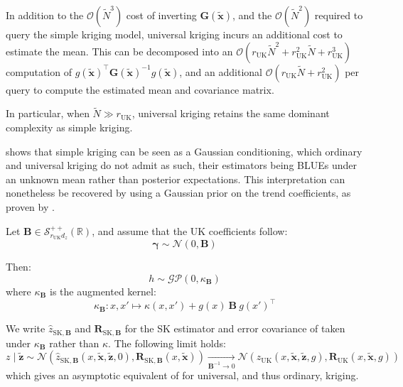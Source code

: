 \begin{remark}
	In addition to the $\mathcal{O}(\tilde{N}^3)$ cost of inverting $\mathbf{G}(\tilde{\mathbf{x}})$, and the $\mathcal{O}(\tilde{N}^2)$ required to query the simple kriging model, universal kriging incurs an additional cost to estimate the mean. This can be decomposed into an $\mathcal{O}(r_{\mathrm{UK}}\tilde{N}^2+r_{\mathrm{UK}}^2\tilde{N}+r_{\mathrm{UK}}^3)$ computation of $g(\tilde{\mathbf{x}})^\top \mathbf{G}(\tilde{\mathbf{x}})^{-1}g(\tilde{\mathbf{x}})$, and an additional $\mathcal{O}(r_{\mathrm{UK}}\tilde{N}+r_{\mathrm{UK}}^2)$ per query to compute the estimated mean and covariance matrix.

	In particular, when $\tilde{N}\gg r_{\mathrm{UK}}$, universal kriging retains the same dominant complexity as simple kriging.
\end{remark}

 shows that simple kriging can be seen as a Gaussian conditioning, which ordinary and universal kriging do not admit as such, their estimators being BLUEs under an unknown mean rather than posterior expectations. This interpretation can nonetheless be recovered by using a Gaussian prior on the trend coefficients, as proven by  \cite{bib:Bayesian-kriging, bib:Bayesian-trend}.

\begin{proposition}\label{th:kriging_vague_prior}
	Let $\mathbf{B}\in\mathcal{S}_{r_{\mathrm{UK}}d_z}^{++}(\mathbb{R})$, and assume that the UK coefficients follow:
	\begin{equation}
		\boldsymbol{\gamma}\sim\mathcal{N}(0,\mathbf{B})
	\end{equation}

	Then:
	\begin{equation}
		h\sim\mathcal{GP}(0,\kappa_{\mathbf{B}})
	\end{equation}
	where $\kappa_{\mathbf{B}}$ is the augmented kernel:
	\begin{equation}
		\kappa_{\mathbf{B}}:x,x'\mapsto \kappa(x,x')+g(x)\:\mathbf{B}\:g(x')^\top
	\end{equation}

	We write $\hat{z}_{\mathrm{SK},\mathbf{B}}$ and $\mathbf{R}_{\mathrm{SK},\mathbf{B}}$ for the SK estimator and error covariance of  taken under $\kappa_{\mathbf{B}}$ rather than $\kappa$. The following limit holds:
	\begin{equation}
		z\mid\tilde{\mathbf{z}}\sim\mathcal{N}\left(\hat{z}_{\mathrm{SK},\mathbf{B}}(x,\tilde{\mathbf{x}},\tilde{\mathbf{z}},0),\mathbf{R}_{\mathrm{SK},\mathbf{B}}(x,\tilde{\mathbf{x}})\right)\underset{\mathbf{B}^{-1}\to0}{\longrightarrow}\mathcal{N}\left(\hat{z}_{\mathrm{UK}}(x,\tilde{\mathbf{x}},\tilde{\mathbf{z}},g),\mathbf{R}_{\mathrm{UK}}(x,\tilde{\mathbf{x}},g)\right)
	\end{equation}
	which gives an asymptotic equivalent of  for universal, and thus ordinary, kriging.
\end{proposition}

